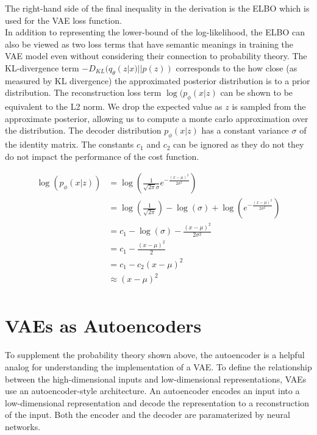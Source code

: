 \documentclass[./dissertation.tex]{subfiles}
\begin{document}
    The right-hand side of the final inequality in the derivation is the ELBO which is used for the VAE loss function. \\
    
    In addition to representing the lower-bound of the log-likelihood, the ELBO can also be viewed as two loss terms that have semantic meanings in training the VAE model even without considering their connection to probability theory. The KL-divergence term $-D_{KL}(q_{\theta}(z|x)||p(z))$ corresponds to the how close (as measured by KL divergence) the approximated posterior distribution is to a prior distribution. The reconstruction loss term $\log(p_{\phi}(x|z)$ can be shown to be equivalent to the L2 norm. We drop the expected value as $z$ is sampled from the approximate posterior, allowing us to compute a monte carlo approximation over the distribution. The decoder distribution $p_{\phi}(x|z) $ has a constant variance $\sigma$ of the identity matrix. The constants $c_{1}$ and $c_{2}$ can be ignored as they do not they do not impact the performance of the cost function. 
    
    \begin{equation*}
    \begin{aligned}
    \log(p_{\phi}(x|z)) &= \log(\frac{1}{\sqrt{2\pi}\sigma}e^{{-\frac{(x - \mu)^{2}}{2\sigma^{2}}}}) \\
    &= \log(\frac{1}{\sqrt{2\pi}}) - \log(\sigma) + \log(e^{{-\frac{(x - \mu)^{2}}{2\sigma^{2}}}}) \\
    &= c_{1} - \log(\sigma) - \frac{(x - \mu)^{2}}{2\sigma^{2}} \\
    &= c_{1} - \frac{(x - \mu)^{2}}{2} \\
    &= c_{1} - c_{2}(x - \mu)^{2} \\
    &\approx (x - \mu)^{2} \\
    \end{aligned}
    \end{equation*}
    
    \section{VAEs as Autoencoders}
    To supplement the probability theory shown above, the autoencoder is a helpful analog for understanding the implementation of a VAE.
    To define the relationship between the high-dimensional inputs and low-dimensional representations, VAEs use an autoencoder-style architecture. An autoencoder encodes an input into a low-dimensional representation and decode the representation to a reconstruction of the input. Both the encoder and the decoder are paramaterized by neural networks. \\
    
\end{document}
